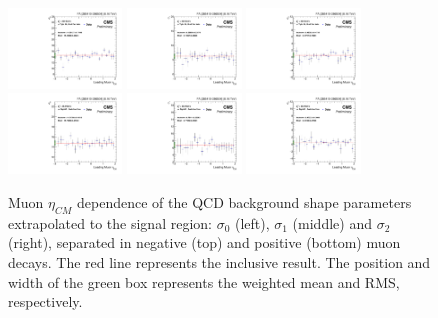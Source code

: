 \begin{figure}[!htbp]
 \begin{center}
  \includegraphics[width=0.27\textwidth]{Figures/WBoson/Analysis/SignalExtraction/QCD_Template/EXTRAPOLATION_ETA/PA/exGraph_ETA_Sigma0_QCDToMuMi_PA.pdf}
  \includegraphics[width=0.27\textwidth]{Figures/WBoson/Analysis/SignalExtraction/QCD_Template/EXTRAPOLATION_ETA/PA/exGraph_ETA_Sigma1_QCDToMuMi_PA.pdf}
  \includegraphics[width=0.27\textwidth]{Figures/WBoson/Analysis/SignalExtraction/QCD_Template/EXTRAPOLATION_ETA/PA/exGraph_ETA_Sigma2_QCDToMuMi_PA.pdf}
  \includegraphics[width=0.27\textwidth]{Figures/WBoson/Analysis/SignalExtraction/QCD_Template/EXTRAPOLATION_ETA/PA/exGraph_ETA_Sigma0_QCDToMuPl_PA.pdf}
  \includegraphics[width=0.27\textwidth]{Figures/WBoson/Analysis/SignalExtraction/QCD_Template/EXTRAPOLATION_ETA/PA/exGraph_ETA_Sigma1_QCDToMuPl_PA.pdf}
  \includegraphics[width=0.27\textwidth]{Figures/WBoson/Analysis/SignalExtraction/QCD_Template/EXTRAPOLATION_ETA/PA/exGraph_ETA_Sigma2_QCDToMuPl_PA.pdf}
 \end{center}
 \caption{Muon $\eta_{CM}$ dependence of the QCD background shape parameters extrapolated to the signal region: $\sigma_{0}$ (left), $\sigma_{1}$ (middle) and $\sigma_{2}$ (right), separated in negative (top) and positive (bottom) muon decays. The red line represents the inclusive result. The position and width of the green box represents the weighted mean and RMS, respectively.}
 \label{fig:QCD_Extrapolation_Eta}
\end{figure}


